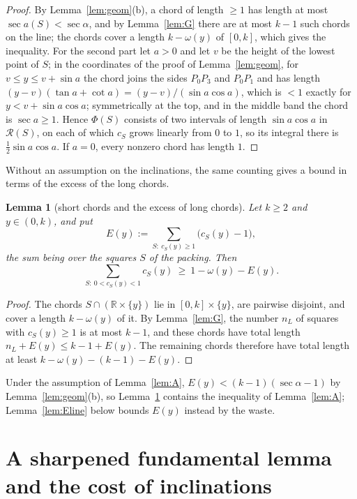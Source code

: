 \documentclass[11pt]{amsart}
\newtheorem{lemma}[theorem]{Lemma}
\theoremstyle{definition}
\theoremstyle{remark}
\newcommand{\R}{\mathbb{R}}
\begin{document}
\begin{proof}
By Lemma~\ref{lem:geom}(b), a chord of length $\ge1$ has length at most $\sec a(S)<\sec\alpha$, and by Lemma~\ref{lem:G} there are
at most $k-1$ such chords on the line; the chords cover a length $k-\omega(y)$ of $[0,k]$, which gives the inequality.
For the second part let $a>0$ and let $v$ be the height of the lowest point of $S$; in the coordinates of the proof of
Lemma~\ref{lem:geom}, for $v\le y\le v+\sin a$ the chord joins
the sides $P_0P_3$ and $P_0P_1$ and has length $(y-v)(\tan a+\cot a)=(y-v)/(\sin a\cos a)$, which is $<1$ exactly for
$y<v+\sin a\cos a$; symmetrically at the top, and in the middle band the chord is $\sec a\ge1$. Hence $\Phi(S)$ consists of two
intervals of length $\sin a\cos a$ in $\mathcal R(S)$, on each of which $c_S$ grows linearly from $0$ to $1$, so its integral
there is $\frac12\sin a\cos a$. If $a=0$, every nonzero chord has length $1$.
\end{proof}

Without an assumption on the inclinations, the same counting gives a bound in terms of the excess of the long chords.

\begin{lemma}[short chords and the excess of long chords]\label{lem:E}
Let $k\ge2$ and $y\in(0,k)$, and put
\[
E(y):=\sum_{S:\ c_S(y)\ge1}\big(c_S(y)-1\big),
\]
the sum being over the squares $S$ of the packing. Then
\[
\sum_{S:\ 0<c_S(y)<1}c_S(y)\ \ge\ 1-\omega(y)-E(y).
\]
\end{lemma}

\begin{proof}
The chords $S\cap(\R\times\{y\})$ lie in $[0,k]\times\{y\}$, are pairwise disjoint, and cover a length $k-\omega(y)$ of it. By
Lemma~\ref{lem:G}, the number $n_L$ of squares with $c_S(y)\ge1$ is at most $k-1$, and these chords have total length
$n_L+E(y)\le k-1+E(y)$. The remaining chords therefore have total length at least $k-\omega(y)-(k-1)-E(y)$.
\end{proof}

Under the assumption of Lemma~\ref{lem:A}, $E(y)<(k-1)(\sec\alpha-1)$ by Lemma~\ref{lem:geom}(b), so Lemma~\ref{lem:E} contains
the inequality of Lemma~\ref{lem:A}; Lemma~\ref{lem:Eline} below bounds $E(y)$ instead by the waste.

\section{A sharpened fundamental lemma and the cost of inclinations}
\end{document}
